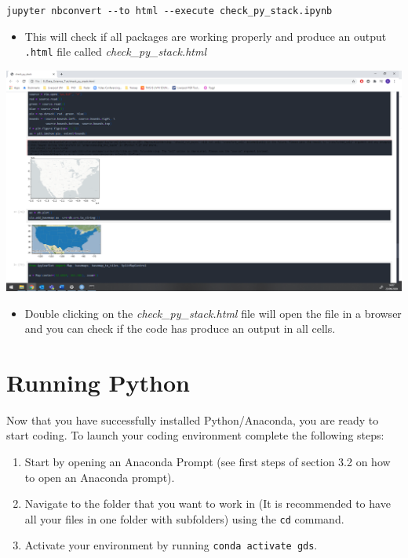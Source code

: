 \documentclass[
]{book}
\providecommand{\tightlist}{%
  \setlength{\itemsep}{0pt}\setlength{\parskip}{0pt}}
\begin{document}
\texttt{jupyter\ nbconvert\ -\/-to\ html\ -\/-execute\ check\_py\_stack.ipynb}

\begin{itemize}
\tightlist
\item
  This will check if all packages are working properly and produce an output \texttt{.html} file called \emph{check\_py\_stack.html}
\end{itemize}

\begin{center}\includegraphics[width=26.86in]{figs/chp4/Picture23} \end{center}

\begin{itemize}
\tightlist
\item
  Double clicking on the \emph{check\_py\_stack.html} file will open the file in a browser and you can check if the code has produce an output in all cells.
\end{itemize}

\hypertarget{running-python}{%
\section*{Running Python}\label{running-python}}

Now that you have successfully installed Python/Anaconda, you are ready to start coding.
To launch your coding environment complete the following steps:

\begin{enumerate}
\def\labelenumi{\arabic{enumi}.}
\item
  Start by opening an Anaconda Prompt (see first steps of section 3.2 on how to open an Anaconda prompt).
\item
  Navigate to the folder that you want to work in (It is recommended to have all your files in one folder with subfolders) using the \texttt{cd} command.
\item
  Activate your environment by running \texttt{conda\ activate\ gds}.
\end{enumerate}
\end{document}
